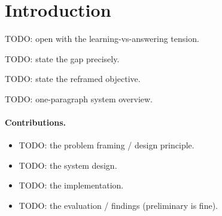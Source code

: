 \section{Introduction}
\label{sec:intro}


TODO: open with the learning-vs-answering tension.

TODO: state the gap precisely.

TODO: state the reframed objective.

TODO: one-paragraph system overview.

\paragraph{Contributions.}
\begin{itemize}
  \item TODO: the problem framing / design principle.
  \item TODO: the system design.
  \item TODO: the implementation.
  \item TODO: the evaluation / findings (preliminary is fine).
\end{itemize}
